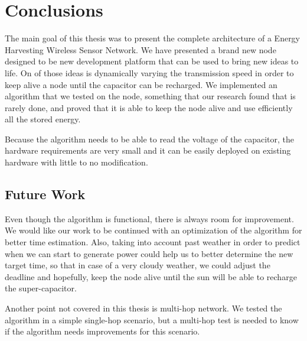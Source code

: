 \chapter{Conclusions}

The main goal of this thesis was to present the complete architecture of a Energy Harvesting Wireless Sensor
Network. We have presented a brand new node designed to be new development platform that can be used to
bring new ideas to life. On of those ideas is dynamically varying the transmission speed in order to
keep alive a node until the capacitor can be recharged. We implemented an algorithm that we tested
on the node, something that our research found that is rarely done, and proved that it is able to
keep the node alive and use efficiently all the stored energy.


Because the algorithm needs to be able to read the voltage of the capacitor, the hardware
requirements are very small and it can be easily deployed on existing hardware with little to no
modification.



\section{Future Work}

Even though the algorithm is functional, there is always room for improvement. We would like our
work to be continued with an optimization of the algorithm for better time estimation. Also, taking
into account past weather in order to predict when we can start to generate power could help us to
better determine the new target time, so that in case of a very cloudy weather, we could adjust the
deadline and hopefully, keep the node alive until the sun will be able to recharge the
super-capacitor.

Another point not covered in this thesis is multi-hop network. We tested the algorithm in a simple
single-hop scenario, but a multi-hop test is needed to know if the algorithm needs improvements for
this scenario.

